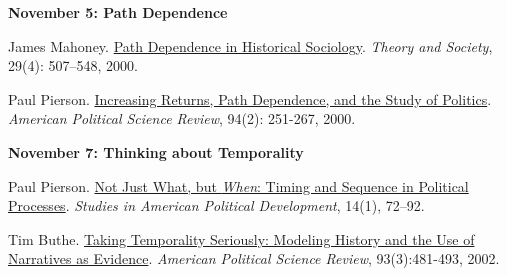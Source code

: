 \documentclass[letterpaper]{article}
\renewenvironment{itemize}{
  \begin{list}{}{
    \setlength{\leftmargin}{1.5em}
  }
}{
  \end{list}
}
\begin{document}
\begin{enumerate}
\begin{itemize}
\begin{itemize}
			\end{itemize}
		\end{itemize}



		\begin{itemize}
		\item {\bf November 5: Path Dependence}
			\begin{itemize}
				\item[$\bullet$] James Mahoney. \href{https://doi.org/10.1023/A:100711383}{Path Dependence in Historical Sociology}. \emph{Theory and Society}, 29(4): 507–548, 2000. 
				\item[$\bullet$] Paul Pierson. \href{http://www.jstor.org/stable/2586011}{Increasing Returns, Path Dependence, and the Study of Politics}. \emph{American Political Science Review}, 94(2): 251-267, 2000. 
			\end{itemize}
		\end{itemize}






		\begin{itemize}
		\item {\bf November 7: Thinking about Temporality}
			\begin{itemize}
				\item[$\bullet$] Paul Pierson. \href{https://www.cambridge.org/core/services/aop-cambridge-core/content/view/S0898588X00003011}{Not Just What, but \emph{When}: Timing and Sequence in Political Processes}. \emph{Studies in American Political Development}, 14(1), 72–92.
				\item[$\bullet$] Tim Buthe. \href{https://people.duke.edu/~buthe/downloads/buthe_apsr_sep2002.pdf}{Taking Temporality Seriously: Modeling History and the Use of Narratives as Evidence}. \emph{American Political Science Review}, 93(3):481-493, 2002.
			\end{itemize}
		\end{itemize}



%		



\end{enumerate}
\end{document}
